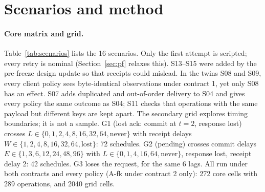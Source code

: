 \documentclass[11pt]{article}
\begin{document}
\section{Scenarios and method}\label{sec:method}

\paragraph{Core matrix and grid.} Table~\ref{tab:scenarios} lists the 16 scenarios. Only the first attempt is scripted; every retry is nominal (Section~\ref{sec:pf} relaxes this). S13--S15 were added by the pre-freeze design update so that receipts could mislead. In the twins S08 and S09, every client policy sees byte-identical observations under contract 1, yet only S08 has an effect. S07 adds duplicated and out-of-order delivery to S04 and gives every policy the same outcome as S04; S11 checks that operations with the same payload but different keys are kept apart. The secondary grid explores timing boundaries; it is not a sample. G1 (lost ack: commit at $t=2$, response lost) crosses $L \in \{0, 1, 2, 4, 8, 16, 32, 64, \text{never}\}$ with receipt delays $W \in \{1, 2, 4, 8, 16, 32, 64, \text{lost}\}$: 72 schedules. G2 (pending) crosses commit delays $E \in \{1, 3, 6, 12, 24, 48, 96\}$ with $L \in \{0, 1, 4, 16, 64, \text{never}\}$, response lost, receipt delay 2: 42 schedules. G3 loses the request, for the same 6 lags. All run under both contracts and every policy (A-fk under contract 2 only): 272 core cells with 289 operations, and 2040 grid cells.
\end{document}
